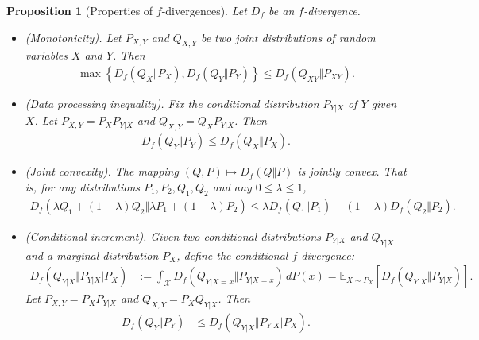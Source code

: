 \documentclass{article}
\numberwithin{equation}{section}
\renewcommand{\cal}{\mathcal}
\theoremstyle{plain}
\newtheorem{proposition}[theorem]{Proposition}
\theoremstyle{definition}
\begin{document}
\begin{proposition}[Properties of $f$-divergences] Let $D_f$ be an $f$-divergence.
\begin{itemize}
\item[(i)] (Monotonicity). Let $P_{X,Y}$ and $Q_{X,Y}$ be two joint distributions of random variables $X$ and $Y$. Then
\begin{align*}
	\max\left\{D_f(Q_X\Vert P_X),D_f(Q_Y\Vert P_Y)\right\}\leq D_f(Q_{XY}\Vert P_{XY}).
\end{align*}
\item[(ii)] (Data processing inequality). Fix the conditional distribution $P_{Y|X}$ of $Y$ given $X$. Let $P_{X,Y}=P_XP_{Y|X}$ and $Q_{X,Y}=Q_XP_{Y|X}$. Then
\begin{align*}
	D_f(Q_Y\Vert P_Y) \leq D_f(Q_X\Vert P_X).
\end{align*}
\item[(iii)] (Joint convexity). The mapping $(Q,P)\mapsto D_f(Q\Vert P)$ is jointly convex. That is, for any distributions $P_1,P_2,Q_1,Q_2$ and any $0\leq\lambda\leq 1$,
\begin{align*}
	D_f\left(\lambda Q_1+(1-\lambda)Q_2\Vert\lambda P_1+(1-\lambda)P_2\right)\leq\lambda D_f(Q_1\Vert P_1)+(1-\lambda)D_f(Q_2\Vert P_2).
\end{align*}
\item[(iv)] (Conditional increment). Given two conditional distributions $P_{Y|X}$ and $Q_{Y|X}$ and a marginal distribution $P_X$, define the conditional $f$-divergence:
\begin{align*}
	D_f(Q_{Y|X}\Vert P_{Y|X}|P_X) &:=\int_{\cal{X}} D_f(Q_{Y|X=x}\Vert P_{Y|X=x})\,dP(x)= \mathbb{E}_{X\sim P_X}\left[D_f(Q_{Y|X}\Vert P_{Y|X})\right].
\end{align*}
Let $P_{X,Y}=P_XP_{Y|X}$ and $Q_{X,Y}=P_XQ_{Y|X}$. Then
\begin{align*}
	D_f(Q_Y\Vert P_Y) &\leq D_f(Q_{Y|X}\Vert P_{Y|X}|P_X).
\end{align*}
\end{itemize}
\end{proposition}
\end{document}
